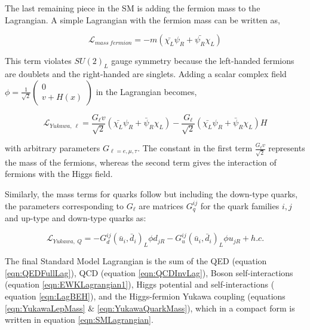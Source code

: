 The last remaining piece in the SM is adding the fermion mass to the Lagrangian. A simple Lagrangian with the fermion mass can be written as, 

\begin{equation}
\mathcal{L}_{mass~fermion} = -m(\bar{\chi_{L}}\psi_{R} + \bar{\psi_{R}}\chi_{L})
\label{eqn:FermMass}
\end{equation}

This term violates $SU(2)_{L}$ gauge symmetry because the left-handed fermions are doublets and the right-handed are singlets. Adding a scalar complex field $\phi =\frac{1}{\sqrt{2}} \begin{pmatrix} 0 \\ v+ H(x) \end{pmatrix}$ in the Lagrangian becomes, 

\begin{equation}
\mathcal{L}_{Yukawa,~\ell} = \frac{G_{\ell}v}{\sqrt{2}} (\bar{\chi_{L}}\psi_{R} + \bar{\psi}_{R}\chi_{L} ) - \frac{G_{\ell}}{\sqrt{2}} (\bar{\chi_{L}}\psi_{R} + \bar{\psi}_{R}\chi_{L} )H
\label{eqn:YukawaLepMass}
\end{equation}

with arbitrary parameters $G_{\ell =e,\mu,\tau}$. The constant in the first term $\frac{G_{\ell}v}{\sqrt{2}}$ represents the mass of the fermions, whereas the second term gives the interaction of fermions with the Higgs field. 

Similarly, the mass terms for quarks follow but including the down-type quarks, the parameters corresponding to $G_{\ell}$ are matrices $G^{ij}_{q}$ for the quark families $i,j$ and up-type and down-type quarks as:

\begin{equation}
\mathcal{L}_{Yukawa,~Q} = -G^{ij}_{d}(\bar{u}_{i} , \bar{d}_{i} )_{L} \phi d_{jR} - G^{ij}_{u}(\bar{u}_{i} , \bar{d}_{i} )_{L} \phi u_{jR} + h.c.
\label{eqn:YukawaQuarkMass}
\end{equation}

The final Standard Model Lagrangian is the sum of the QED (equation \ref{eqn:QEDFullLag}), QCD (equation \ref{eqn:QCDInvLag}), Boson self-interactions (equation \ref{eqn:EWKLagrangian1}), Higgs potential and self-interactions ( equation \ref{eqn:LagBEH}), and the Higgs-fermion Yukawa coupling (equations \ref{eqn:YukawaLepMass} $\&$ \ref{eqn:YukawaQuarkMass}), which in a compact form is written in equation \ref{eqn:SMLagrangian}.
